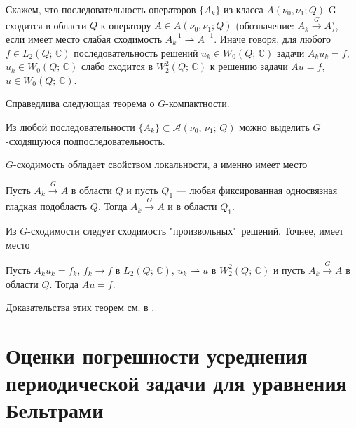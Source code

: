 
\begin{definition}
Скажем, что последовательность  операторов $\{A_k\}$ из класса \linebreak
$A(\nu_0,\nu_1; Q)$ G-сходится в области $Q$ к оператору $A \in A(\nu_0,	\nu_1; Q)$ (обозначение:
$A_k\overset{G}\longrightarrow A$), если имеет место слабая сходимость $ A_k^{-1}\rightharpoonup A^{-1}$. Иначе говоря, для любого $f\in L_2(Q;\,\mathbb{C})$ последовательность решений $u_k\in W_0(Q;\,\mathbb{C})$ задачи $A_ku_k=f$, $u_k\in W_0(Q;\,\mathbb{C})$ слабо сходится в $W_2^2(Q;\,\mathbb{C})$ к решению задачи $Au=f$, $u\in W_0(Q;\,\mathbb{C})$.
\end{definition}


Справедлива следующая теорема о $G$-компактности.
\begin{theorem} \label{smm1_teor2}
    Из любой последовательности $\{A_k\}\subset \mathcal{A}(\nu_0,\,\nu_1;\,Q)$
    можно выделить $G$-сходящуюся подпоследовательность.
\end{theorem}
$G$-сходимость обладает свойством локальности, а именно имеет место
\begin{theorem} \label{smm1_teor3}
     Пусть $A_k\overset{G}{\to}A$  в области $Q$ и пусть $Q_1$ --- любая
     фиксированная односвязная гладкая подобласть $Q$.
     Тогда $A_k\overset{G}\longrightarrow A$ и в области $Q_1$.
\end{theorem}

Из $G$-сходимости следует сходимость "произвольных"\     решений. Точнее, имеет место
\begin{theorem}\label{teor4}
 Пусть $A_ku_k=f_k$, $f_k\to f$ в $L_2(Q;\,\mathbb{C})$, $u_k\rightharpoonup u $
 в $W_2^2(Q;\,\mathbb{C})$ и пусть $A_k\overset{G}\longrightarrow A$ в области $Q$.
 Тогда $Au=f$.
\end{theorem}

Доказательства этих теорем см. в \cite{smm_DZh}.











\chapter{Оценки погрешности усреднения периодической задачи для уравнения Бельтрами}


